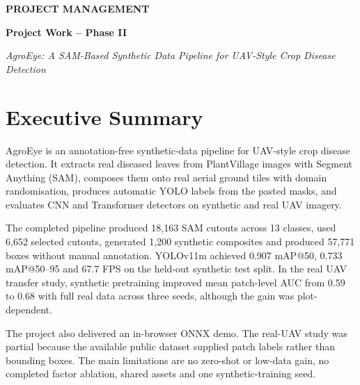 \documentclass[12pt,a4paper]{report}
\theoremstyle{definition}
\theoremstyle{remark}
\begin{document}
\renewcommand{\contentsname}{Contents}
\tableofcontents
\newpage

\begin{center}
{\LARGE\bfseries\color{navy} PROJECT MANAGEMENT}\par
{\Large\bfseries\color{navy} Project Work -- Phase II}\par
{\large\itshape AgroEye: A SAM-Based Synthetic Data Pipeline for UAV-Style Crop Disease Detection}
\end{center}

\section{Executive Summary}
AgroEye is an annotation-free synthetic-data pipeline for UAV-style crop disease detection. It extracts real diseased leaves from PlantVillage images with Segment Anything (SAM), composes them onto real aerial ground tiles with domain randomisation, produces automatic YOLO labels from the pasted masks, and evaluates CNN and Transformer detectors on synthetic and real UAV imagery.

The completed pipeline produced 18,163 SAM cutouts across 13 classes, used 6,652 selected cutouts, generated 1,200 synthetic composites and produced 57,771 boxes without manual annotation. YOLOv11m achieved 0.907 mAP@50, 0.733 mAP@50--95 and 67.7 FPS on the held-out synthetic test split. In the real UAV transfer study, synthetic pretraining improved mean patch-level AUC from 0.59 to 0.68 with full real data across three seeds, although the gain was plot-dependent.

The project also delivered an in-browser ONNX demo. The real-UAV study was partial because the available public dataset supplied patch labels rather than bounding boxes. The main limitations are no zero-shot or low-data gain, no completed factor ablation, shared assets and one synthetic-training seed.
\end{document}

